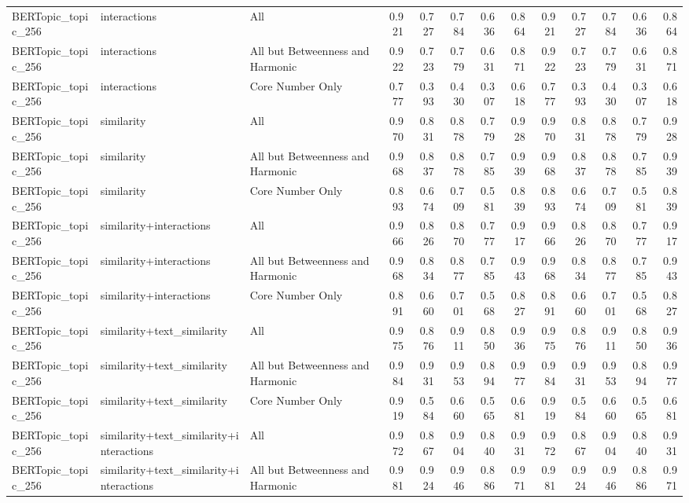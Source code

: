 \begin{tabular}{lllrrrrrrrrrr}
BERTopic_topic_256 & interactions & All & 0.921 & 0.727 & 0.784 & 0.636 & 0.864 & 0.921 & 0.727 & 0.784 & 0.636 & 0.864 \\
BERTopic_topic_256 & interactions & All but Betweenness and Harmonic & 0.922 & 0.723 & 0.779 & 0.631 & 0.871 & 0.922 & 0.723 & 0.779 & 0.631 & 0.871 \\
BERTopic_topic_256 & interactions & Core Number Only & 0.777 & 0.393 & 0.430 & 0.307 & 0.618 & 0.777 & 0.393 & 0.430 & 0.307 & 0.618 \\
BERTopic_topic_256 & similarity & All & 0.970 & 0.831 & 0.878 & 0.779 & 0.928 & 0.970 & 0.831 & 0.878 & 0.779 & 0.928 \\
BERTopic_topic_256 & similarity & All but Betweenness and Harmonic & 0.968 & 0.837 & 0.878 & 0.785 & 0.939 & 0.968 & 0.837 & 0.878 & 0.785 & 0.939 \\
BERTopic_topic_256 & similarity & Core Number Only & 0.893 & 0.674 & 0.709 & 0.581 & 0.839 & 0.893 & 0.674 & 0.709 & 0.581 & 0.839 \\
BERTopic_topic_256 & similarity+interactions & All & 0.966 & 0.826 & 0.870 & 0.777 & 0.917 & 0.966 & 0.826 & 0.870 & 0.777 & 0.917 \\
BERTopic_topic_256 & similarity+interactions & All but Betweenness and Harmonic & 0.968 & 0.834 & 0.877 & 0.785 & 0.943 & 0.968 & 0.834 & 0.877 & 0.785 & 0.943 \\
BERTopic_topic_256 & similarity+interactions & Core Number Only & 0.891 & 0.660 & 0.701 & 0.568 & 0.827 & 0.891 & 0.660 & 0.701 & 0.568 & 0.827 \\
BERTopic_topic_256 & similarity+text_similarity & All & 0.975 & 0.876 & 0.911 & 0.850 & 0.936 & 0.975 & 0.876 & 0.911 & 0.850 & 0.936 \\
BERTopic_topic_256 & similarity+text_similarity & All but Betweenness and Harmonic & 0.984 & 0.931 & 0.953 & 0.894 & 0.977 & 0.984 & 0.931 & 0.953 & 0.894 & 0.977 \\
BERTopic_topic_256 & similarity+text_similarity & Core Number Only & 0.919 & 0.584 & 0.660 & 0.565 & 0.681 & 0.919 & 0.584 & 0.660 & 0.565 & 0.681 \\
BERTopic_topic_256 & similarity+text_similarity+interactions & All & 0.972 & 0.867 & 0.904 & 0.840 & 0.931 & 0.972 & 0.867 & 0.904 & 0.840 & 0.931 \\
BERTopic_topic_256 & similarity+text_similarity+interactions & All but Betweenness and Harmonic & 0.981 & 0.924 & 0.946 & 0.886 & 0.971 & 0.981 & 0.924 & 0.946 & 0.886 & 0.971 \\

\end{tabular}
